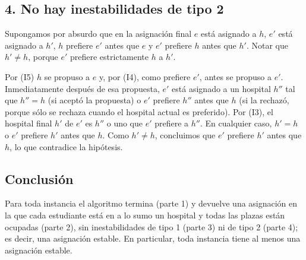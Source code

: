 \subsection*{4. No hay inestabilidades de tipo 2}
Supongamos por absurdo que en la asignación final $e$ está asignado a $h$, $e'$ está asignado a
$h'$, $h$ prefiere $e'$ antes que $e$ y $e'$ prefiere $h$ antes que $h'$. Notar que $h'\ne h$,
porque $e'$ prefiere estrictamente $h$ a $h'$.

Por (I5) $h$ se propuso a $e$ y, por (I4), como prefiere $e'$, antes se propuso a $e'$. Inmediatamente después de esa propuesta, $e'$ está asignado a un hospital $h''$ tal que
$h''=h$ (si aceptó la propuesta) o $e'$ prefiere $h''$ antes que $h$ (si la rechazó, porque sólo
se rechaza cuando el hospital actual es preferido). Por (I3), el hospital final $h'$ de $e'$ es
$h''$ o uno que $e'$ prefiere a $h''$. En cualquier caso, $h'=h$ o $e'$ prefiere $h'$ antes que
$h$. Como $h'\ne h$, concluimos que $e'$ prefiere $h'$ antes que $h$, lo que contradice la
hipótesis.

\subsection*{Conclusión}
Para toda instancia el algoritmo termina (parte 1) y devuelve una asignación en la que cada
estudiante está en a lo sumo un hospital y todas las plazas están ocupadas (parte 2), sin
inestabilidades de tipo 1 (parte 3) ni de tipo 2 (parte 4); es decir, una asignación estable.
En particular, toda instancia tiene al menos una asignación estable.


